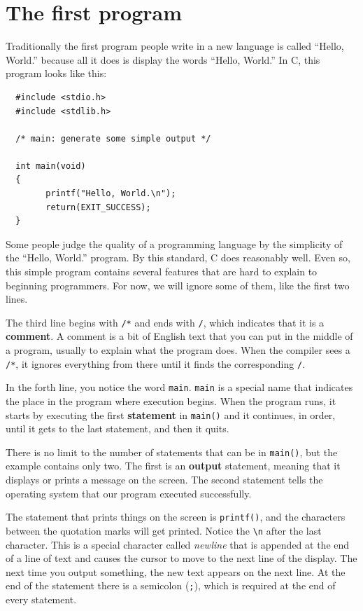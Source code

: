 \section{The first program}
\label{hello}

Traditionally the first program people write in a new language
is called ``Hello, World.'' because all it does is display the
words ``Hello, World.''  In C, this program looks like this:

\begin{verbatim}
  #include <stdio.h>
  #include <stdlib.h>

  /* main: generate some simple output */

  int main(void)
  {
        printf("Hello, World.\n");
        return(EXIT_SUCCESS);
  }

\end{verbatim}
%
Some people judge the quality of a programming language by
the simplicity of the ``Hello, World.'' program.  By this
standard, C does reasonably well.  Even so, this simple program 
contains several features that are hard to explain 
to beginning programmers. For now, we will ignore some of them, 
like the first two lines.


The third line begins with {\tt /*} and ends with  {\tt */}, which indicates
that it is a {\bf comment}.  A comment is a bit of
English text that you can put in the middle of a program,
usually to explain what the program does.  When the compiler
sees a {\tt /*}, it ignores everything from there until it finds the corresponding
 {\tt */}.

In the forth line, you notice the word {\tt main}.  {\tt main} is a
special name that indicates the place in the program where execution
begins.  When the program runs, it starts by executing the first
{\bf statement} in {\tt main()} and it continues, in order, until it gets
to the last statement, and then it quits.



There is no limit to the number of statements that can be in 
{\tt main()}, but the example contains only two. 
The first  is an {\bf output} statement, 
meaning that it displays or prints a message on the screen.
The second statement tells the operating system that our program
executed successfully.  

The statement that prints things on the screen is
{\tt printf()}, and the characters between the quotation marks
will get printed. Notice the {\tt \textbackslash n} after the 
last character. This is a special character called \emph{newline} that is appended at the end 
of a line of text  and causes the cursor to move to the next line of the display. 
The next time you output something, the new text appears on the next line.
At the end of the statement
there is a semicolon ({\tt ;}), which is required at the end
of every statement.

